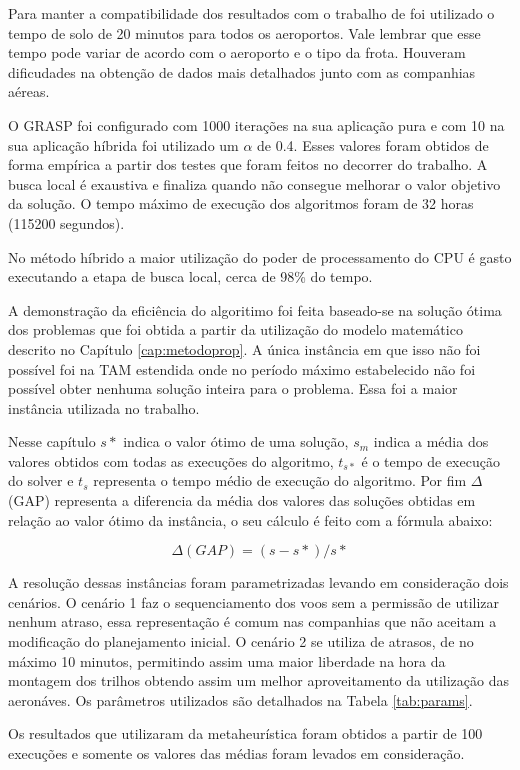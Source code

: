 Para manter a compatibilidade dos resultados com o trabalho de
\cite{pontes2002} foi utilizado o tempo de solo de 20 minutos para todos os
aeroportos. Vale lembrar que esse tempo pode variar de acordo com o aeroporto e
o tipo da frota. Houveram dificudades na obtenção de dados mais detalhados junto
com as companhias aéreas.

O GRASP foi configurado com 1000 iterações na sua aplicação pura e com 10 na
sua aplicação híbrida foi utilizado um $\alpha$ de 0.4. Esses valores foram obtidos de
forma empírica a partir dos testes que foram feitos no decorrer do trabalho. A
busca local é exaustiva e finaliza quando não consegue melhorar o valor
objetivo da solução. O tempo máximo de execução dos algoritmos foram de 32 horas
(115200 segundos).

No método híbrido a maior utilização do poder de processamento do CPU é
gasto executando a etapa de busca local, cerca de 98\% do tempo. 

A demonstração da eficiência do algoritimo foi feita baseado-se na solução ótima
dos problemas que foi obtida a partir da utilização do modelo
matemático descrito no Capítulo \ref{cap:metodoprop}. A única
instância em que isso não foi possível foi na TAM estendida onde no período
máximo estabelecido não foi possível obter nenhuma solução inteira para o
problema. Essa foi a maior instância utilizada no trabalho.

Nesse capítulo $s*$ indica o valor ótimo de uma solução, $s_{m}$ indica a média
dos valores obtidos com todas as execuções do algoritmo, $t_{s*}$ é o
tempo de execução do solver e $t_{s}$ representa o tempo médio de execução do
algoritmo. Por fim $\Delta$ (GAP) representa a diferencia da média dos valores
das soluções obtidas em relação ao valor ótimo da instância, o seu cálculo é
feito com a fórmula abaixo:

\[  \Delta (GAP) = (s - s*)/s* \]

A resolução dessas instâncias foram parametrizadas levando em consideração dois
cenários. O cenário 1 faz o sequenciamento dos voos sem a permissão de utilizar
nenhum atraso, essa representação é comum nas companhias que não aceitam a
modificação do planejamento inicial. O cenário 2 se utiliza de atrasos, de no
máximo 10 minutos, permitindo assim uma maior liberdade na hora da montagem dos
trilhos obtendo assim um melhor aproveitamento da utilização das aeronáves. Os parâmetros
utilizados são detalhados na Tabela \ref{tab:params}.

Os resultados que utilizaram da metaheurística foram obtidos a partir de 100
execuções e somente os valores das médias foram levados em consideração.


